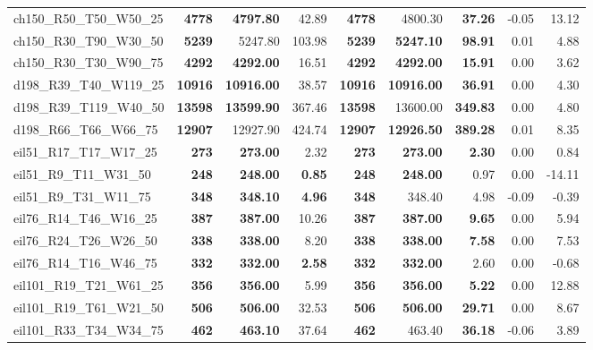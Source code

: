 \documentclass{singlecol-new}
\begin{document}
\begin{scriptsize}
\begin{longtable}{lrrrrrrrr}
		ch150\_R50\_T50\_W50\_25 & \textbf{4778} & \textbf{4797.80} & 42.89 & \textbf{4778} & 4800.30 & \textbf{37.26} & -0.05 & 13.12 \\
		ch150\_R30\_T90\_W30\_50 & \textbf{5239} & 5247.80 & 103.98 & \textbf{5239} & \textbf{5247.10} & \textbf{98.91} & 0.01 & 4.88 \\
		ch150\_R30\_T30\_W90\_75 & \textbf{4292} & \textbf{4292.00} & 16.51 & \textbf{4292} & \textbf{4292.00} & \textbf{15.91} & 0.00 & 3.62 \\
		d198\_R39\_T40\_W119\_25 & \textbf{10916} & \textbf{10916.00} & 38.57 & \textbf{10916} & \textbf{10916.00} & \textbf{36.91} & 0.00 & 4.30 \\
		d198\_R39\_T119\_W40\_50 & \textbf{13598} & \textbf{13599.90} & 367.46 & \textbf{13598} & 13600.00 & \textbf{349.83} & 0.00 & 4.80 \\
		d198\_R66\_T66\_W66\_75 & \textbf{12907} & 12927.90 & 424.74 & \textbf{12907} & \textbf{12926.50} & \textbf{389.28} & 0.01 & 8.35 \\
		eil51\_R17\_T17\_W17\_25 & \textbf{273} & \textbf{273.00} & 2.32 & \textbf{273} & \textbf{273.00} & \textbf{2.30} & 0.00 & 0.84 \\
		eil51\_R9\_T11\_W31\_50 & \textbf{248} & \textbf{248.00} & \textbf{0.85} & \textbf{248} & \textbf{248.00} & 0.97 & 0.00 & -14.11 \\
		eil51\_R9\_T31\_W11\_75 & \textbf{348} & \textbf{348.10} & \textbf{4.96} & \textbf{348} & 348.40 & 4.98 & -0.09 & -0.39 \\
		eil76\_R14\_T46\_W16\_25 & \textbf{387} & \textbf{387.00} & 10.26 & \textbf{387} & \textbf{387.00} & \textbf{9.65} & 0.00 & 5.94 \\
		eil76\_R24\_T26\_W26\_50 & \textbf{338} & \textbf{338.00} & 8.20 & \textbf{338} & \textbf{338.00} & \textbf{7.58} & 0.00 & 7.53 \\
		eil76\_R14\_T16\_W46\_75 & \textbf{332} & \textbf{332.00} & \textbf{2.58} & \textbf{332} & \textbf{332.00} & 2.60 & 0.00 & -0.68 \\
		eil101\_R19\_T21\_W61\_25 & \textbf{356} & \textbf{356.00} & 5.99 & \textbf{356} & \textbf{356.00} & \textbf{5.22} & 0.00 & 12.88 \\
		eil101\_R19\_T61\_W21\_50 & \textbf{506} & \textbf{506.00} & 32.53 & \textbf{506} & \textbf{506.00} & \textbf{29.71} & 0.00 & 8.67 \\
		eil101\_R33\_T34\_W34\_75 & \textbf{462} & \textbf{463.10} & 37.64 & \textbf{462} & 463.40 & \textbf{36.18} & -0.06 & 3.89 \\

\end{longtable}
\end{scriptsize}
\end{document}
